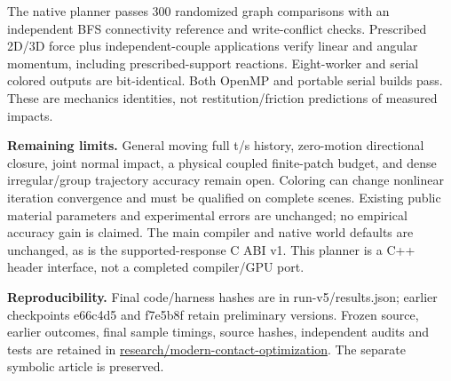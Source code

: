 \documentclass[10pt,a4paper]{article}
\begin{document}
The native planner passes 300 randomized graph comparisons with an independent
BFS connectivity reference and write-conflict checks. Prescribed 2D/3D force
plus independent-couple applications verify linear and angular momentum,
including prescribed-support reactions. Eight-worker and serial colored outputs
are bit-identical. Both OpenMP and portable serial builds pass. These are
mechanics identities, not restitution/friction predictions of measured impacts.

\textbf{Remaining limits.} General moving full t/s history, zero-motion directional
closure, joint normal impact, a physical coupled finite-patch budget, and dense
irregular/group trajectory accuracy remain open. Coloring can change nonlinear
iteration convergence and must be qualified on complete scenes. Existing public
material parameters and experimental errors are unchanged; no empirical
accuracy gain is claimed. The main compiler and native world defaults are
unchanged, as is the supported-response C ABI v1. This planner is a C++ header
interface, not a completed compiler/GPU port.

\textbf{Reproducibility.} Final code/harness hashes are in run-v5/results.json;
earlier checkpoints e66c4d5 and f7e5b8f retain preliminary versions. Frozen source, earlier outcomes, final
sample timings, source hashes, independent audits and tests are retained in
\href{https://github.com/svenviktorjonsson/rigid-body-collisions/tree/research/adaptive-benchmark-validation/research/modern-contact-optimization}{research/modern-contact-optimization}.
The separate symbolic article is preserved.
\end{document}
